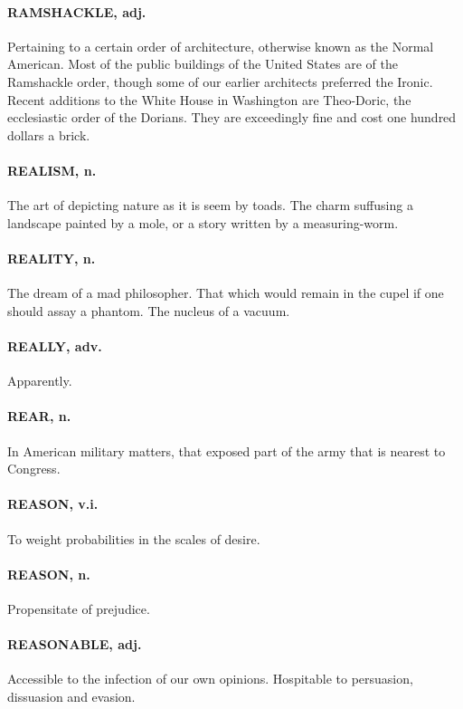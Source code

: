 \documentclass[11pt]{article}
\begin{document}
\paragraph{RAMSHACKLE, adj.}  Pertaining to a certain order of architecture,
otherwise known as the Normal American.  Most of the public buildings
of the United States are of the Ramshackle order, though some of our
earlier architects preferred the Ironic.  Recent additions to the
White House in Washington are Theo-Doric, the ecclesiastic order of
the Dorians.  They are exceedingly fine and cost one hundred dollars a
brick.

\paragraph{REALISM, n.}  The art of depicting nature as it is seem by toads.  The
charm suffusing a landscape painted by a mole, or a story written by a
measuring-worm.

\paragraph{REALITY, n.}  The dream of a mad philosopher.  That which would remain
in the cupel if one should assay a phantom.  The nucleus of a vacuum.

\paragraph{REALLY, adv.}  Apparently.

\paragraph{REAR, n.}  In American military matters, that exposed part of the army
that is nearest to Congress.

\paragraph{REASON, v.i.}  To weight probabilities in the scales of desire.

\paragraph{REASON, n.}  Propensitate of prejudice.

\paragraph{REASONABLE, adj.}  Accessible to the infection of our own opinions.
Hospitable to persuasion, dissuasion and evasion.
\end{document}
